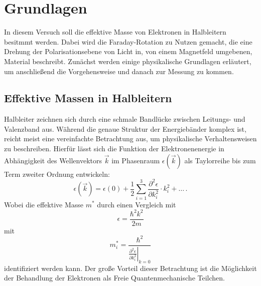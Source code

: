 \section{Grundlagen} %
\label{sec:grundlagen}
In diesem Versuch soll die effektive Masse von Elektronen in Halbleitern
besitmmt werden.
Dabei wird die Faraday-Rotation zu Nutzen gemacht, die eine Drehung
der Polarisationsebene von Licht in, von einem Magnetfeld umgebenen,
Material beschreibt.
Zunächst werden einige physikalische Grundlagen erläutert, um anschließend
die Vorgehensweise und danach zur Messung zu kommen.

\subsection{Effektive Massen in Halbleitern} %
\label{sub:effektive_masse}
Halbleiter zeichnen sich durch eine schmale Bandlücke zwischen Leitungs-
und Valenzband aus.
Während die genaue Struktur der Energiebänder komplex ist, reicht meist
eine vereinfachte Betrachtung aus, um physikalische Verhaltensweisen zu
beschreiben.
Hierfür lässt sich die Funktion der Elektronenenergie in Abhängigkeit des
Wellenvektors $\vec{k}$ im Phasenraum
$\epsilon(\vec{k})$ als Taylorreihe bis zum Term zweiter Ordnung entwickeln:
\begin{equation}
    \label{eqn:energie}
    \epsilon\left(\vec{k}\right) = \epsilon(0) + \frac{1}{2}\sum_{i=1}^{3}\frac{\partial^2\epsilon}{\partial k_i^2}\cdot k_i^2 + \dots\,.
\end{equation}
Wobei die effektive Masse $m^*$ durch einen Vergleich mit
\begin{equation*}
    \epsilon = \frac{\hbar^2 k^2}{2m}
\end{equation*}
mit
\begin{equation}
    m_i^* = \frac{\hbar^2}{\left.\frac{\partial^2\epsilon}{\partial k_i^2}\right|_{k=0}}
\end{equation}
identifiziert werden kann. Der große Vorteil dieser Betrachtung ist die
Möglichkeit der Behandlung der Elektronen als Freie Quantenmechanische
Teilchen.
